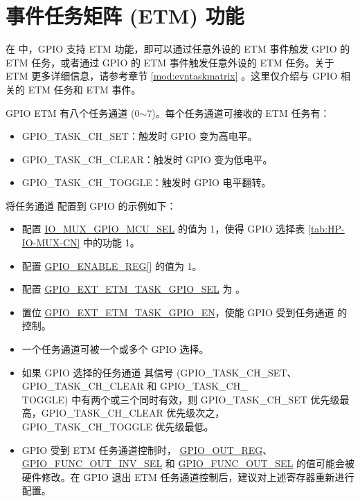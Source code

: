 \documentclass[main\_\_CN.tex]{subfiles}
\begin{document}
\section{事件任务矩阵 (ETM) 功能}

在 \chipname{} 中，GPIO 支持 ETM 功能，即可以通过任意外设的 ETM 事件触发 GPIO 的 ETM 任务，或者通过 GPIO 的 ETM 事件触发任意外设的 ETM 任务。关于 ETM 更多详细信息，请参考章节 \ref{mod:evntaskmatrix} \textit{}。这里仅介绍与 GPIO 相关的 ETM 任务和 ETM 事件。

GPIO ETM 有八个任务通道  (0$\sim$7)。每个任务通道可接收的 ETM 任务有：

\begin{itemize}
    \item GPIO\_TASK\_CH\_SET：触发时 GPIO 变为高电平。
    \item GPIO\_TASK\_CH\_CLEAR：触发时 GPIO 变为低电平。
    \item GPIO\_TASK\_CH\_TOGGLE：触发时 GPIO 电平翻转。
\end{itemize}

将任务通道  配置到 GPIO 的示例如下：

\begin{itemize}
    \item 配置 \hyperref[fielddesc:IOMUXGPIONMCUSEL]{IO\_MUX\_GPIO\_MCU\_SEL} 的值为 1，使得 GPIO 选择表 \ref{tab:HP-IO-MUX-CN} 中的功能 1。
    \item 配置 \hyperref[regdesc:GPIOENABLEREG]{GPIO\_ENABLE\_REG[]} 的值为 1。
    \item 配置 \hyperref[fielddesc:GPIOEXTETMTASKGPIO0SEL]{GPIO\_EXT\_ETM\_TASK\_GPIO\_SEL} 为 。
    \item 置位 \hyperref[fielddesc:GPIOEXTETMTASKGPIO0EN]{GPIO\_EXT\_ETM\_TASK\_GPIO\_EN}，使能 GPIO 受到任务通道  的控制。
\end{itemize}

\begin{tiplisting}
\vspace{-2em}
\begin{itemize}
\item 一个任务通道可被一个或多个 GPIO 选择。

\item 如果 GPIO 选择的任务通道  其信号 (GPIO\_TASK\_CH\_SET、GPIO\_TASK\_CH\_CLEAR 和 GPIO\_TASK\_CH\_\\TOGGLE) 中有两个或三个同时有效，则 GPIO\_TASK\_CH\_SET 优先级最高，GPIO\_TASK\_CH\_CLEAR 优先级次之，GPIO\_TASK\_CH\_TOGGLE 优先级最低。

\item GPIO 受到 ETM 任务通道控制时， \hyperref[regdesc:GPIOOUTREG]{GPIO\_OUT\_REG}、 \hyperref[fielddesc:GPIOFUNCNOUTINVSEL]{GPIO\_FUNC\_OUT\_INV\_SEL} 和 \hyperref[fielddesc:GPIOFUNCNOUTSEL]{GPIO\_FUNC\_OUT\_SEL} 的值可能会被硬件修改。在 GPIO 退出 ETM 任务通道控制后，建议对上述寄存器重新进行配置。
\end{itemize}
\end{tiplisting}
\end{document}
